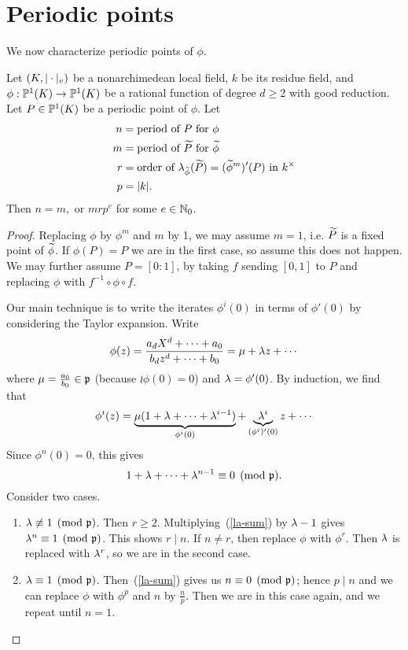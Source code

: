 \section{Periodic points}
We now characterize periodic points of $\phi$.
\begin{thm}\label{possible-periods}
Let $(K,|\cdot|_v)$ be a nonarchimedean local field, $k$ be its residue field, and $\phi:\mathbb{P}^1(K)\to \mathbb{P}^1(K)$ be a rational function of degree $d\ge 2$ with good reduction. Let $P\in \mathbb{P}^1(K)$ be a periodic point of $\phi$. Let 
\begin{align*}
n&=\text{period of }P\text{ for }\phi\\
m&=\text{period of }\widetilde{P}\text{ for }\widetilde{\phi}\\
r&=\text{order of }\lambda_{\widetilde{\phi}}(\widetilde{P})=(\widetilde{\phi}^m)'(P) \text{ in }k^{\times}\\
p&=|k|.
\end{align*}
Then $n=m, \text{ or }mrp^e$ for some $e\in \mathbb{N}_0$.
\end{thm}
\begin{proof}
Replacing $\phi$ by $\phi^m$ and $m$ by 1, we may assume $m=1$, i.e. $\widetilde{P}$ is a fixed point of $\widetilde{\phi}$. If $\phi(P)=P$ we are in the first case, so assume this does not happen. We may further assume $P=[0:1]$, by taking $f$ sending $[0,1]$ to $P$ and replacing $\phi$ with $f^{-1}\circ \phi \circ f$. 

Our main technique is to write the iterates $\phi^i(0)$ in terms of $\phi'(0)$ by considering the Taylor expansion.
Write
\[\phi(z)
=\frac{a_dX^d+\cdots +a_0}{b_dz^d+\cdots + b_0}
=\mu+\lambda z+\cdots\]
where $\mu=\frac{a_0}{b_0}\in \mathfrak{p}$ (because $\wr{\phi}(0)=0$) and $\lambda=\phi'(0)$. By induction, we find that
\[
\phi^i(z)= \underbrace{\mu(1+\lambda+\cdots +\lambda^{i-1})}_{\phi^i(0)}+\underbrace{\lambda^i}_{(\phi^i)'(0)}z+\cdots 
\]
Since $\phi^n(0)=0$, this gives
\begin{equation}
\label{la-sum}
1+\lambda+\cdots +\lambda^{n-1}\equiv 0\pmod{\mathfrak{p}}.
\end{equation}
Consider two cases.
\begin{enumerate}
\item
$\lambda\not\equiv 1\pmod{\mathfrak{p}}$. Then $r\ge 2$.  Multiplying~(\ref{la-sum}) by $\lambda-1$ gives $\lambda^n\equiv 1\pmod{\mathfrak{p}}$. This shows $r\mid n$. If $n\neq r$, then replace $\phi$ with $\phi^r$. Then $\lambda$ is replaced with $\lambda^r$, so we are in the second case.
\item
$\lambda\equiv 1\pmod{\mathfrak{p}}$. Then~(\ref{la-sum}) gives us $n\equiv 0\pmod{\mathfrak{p}}$; hence $p\mid n$ and we can replace $\phi$ with $\phi^p$ and $n$ by $\frac np$. Then we are in this case again, and we repeat until $n=1$.\qedhere
\end{enumerate}
\end{proof}
